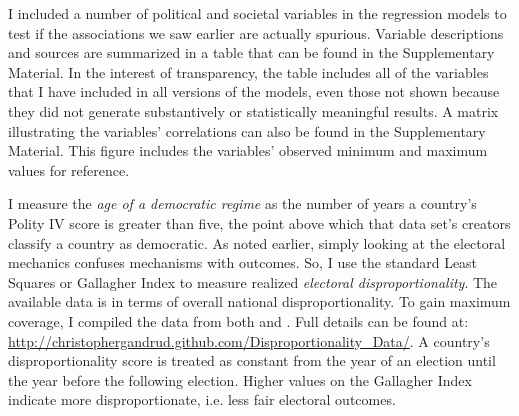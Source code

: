 \documentclass[a4paper]{article}\usepackage[]{graphicx}\usepackage[]{color}
\begin{document}
I included a number of political and societal variables in the regression models to test if the associations we saw earlier are actually spurious. Variable descriptions and sources are summarized in a table that can be found in the Supplementary Material. In the interest of transparency, the table includes all of the variables that I have included in all versions of the models, even those not shown because they did not generate substantively or statistically meaningful results. A matrix illustrating the variables' correlations can also be found in the Supplementary Material. This figure includes the variables' observed minimum and maximum values for reference.

I measure the {\emph{age of a democratic regime}} as the number of years a country's Polity IV score \citep{Marshall2009} is greater than five, the point above which that data set's creators classify a country as democratic.  As noted earlier, simply looking at the electoral mechanics confuses mechanisms with outcomes. So, I use the standard Least Squares or Gallagher Index \citep{Gallagher1991} to measure realized {\emph{electoral disproportionality}}. The available data is in terms of overall national disproportionality. To gain maximum coverage, I compiled the data from both \cite{Gallagher2012} and \cite{Carey2011}. Full details can be found at: \url{http://christophergandrud.github.com/Disproportionality_Data/}. A country's disproportionality score is treated as constant from the year of an election until the year before the following election. Higher values on the Gallagher Index indicate more disproportionate, i.e. less fair electoral outcomes.
\end{document}
